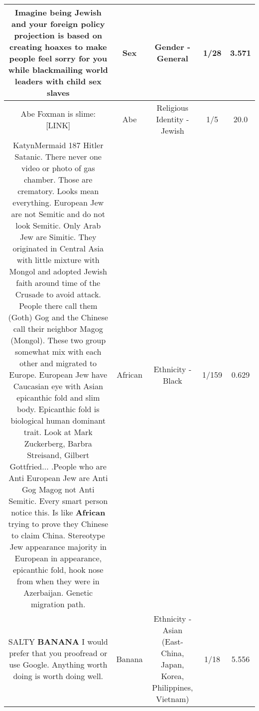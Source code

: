 \documentclass[11pt]{article}
\newlength\mylength
\begin{document}
\begin{center}
\begin{longtable}{|C{.65\mylength}|C{.30\mylength}|C{.12\mylength}|C{.12\mylength}|C{.12\mylength}|}
  \small Imagine being Jewish and your foreign policy projection is based on creating hoaxes to make people feel sorry for you while blackmailing world leaders with child \textbf{sex} slaves\normalsize   & Sex & Gender - General & 1/28 & 3.571 \\  \hline
  \small Abe Foxman is slime:   [LINK] \normalsize   & Abe & Religious Identity - Jewish & 1/5 & 20.0 \\  \hline
  \small KatynMermaid 187 Hitler Satanic. There never one video or photo of gas chamber. Those are crematory. Looks mean everything. European Jew are not Semitic and do not look Semitic. Only Arab Jew are Simitic. They originated in Central Asia with little mixture with Mongol and adopted Jewish faith around time of the Crusade to avoid attack. People there call them (Goth) Gog and the Chinese call their neighbor Magog (Mongol). These two group somewhat mix with each other and migrated to Europe. European Jew have Caucasian eye with Asian epicanthic fold and slim body. Epicanthic fold is biological human dominant trait. Look at Mark Zuckerberg, Barbra Streisand, Gilbert Gottfried... .People who are Anti European Jew are Anti Gog Magog not Anti Semitic. Every smart person notice this.  Is like \textbf{African} trying to prove they Chinese to claim China. Stereotype Jew appearance majority in European in appearance, epicanthic fold, hook nose from when they were in Azerbaijan. Genetic migration path.\normalsize   & African & Ethnicity - Black & 1/159 & 0.629 \\  \hline
  \small SALTY \textbf{BANANA} I would prefer that you proofread or use Google. Anything worth doing is worth doing well.\normalsize   & Banana & Ethnicity - Asian (East- China, Japan, Korea, Philippines, Vietnam) & 1/18 & 5.556 \\  \hline

\end{longtable}
\end{center}
\end{document}
